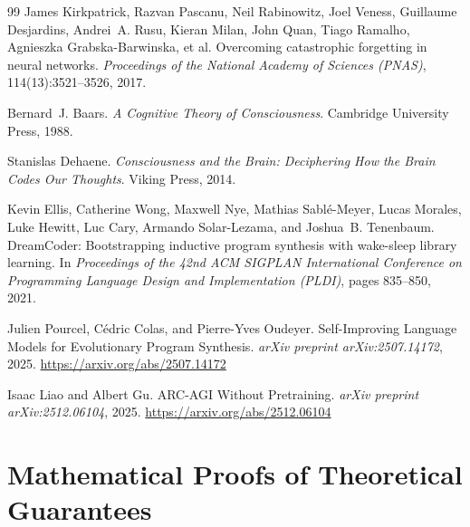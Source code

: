 \documentclass[10pt,a4paper]{article}
\begin{document}
\begin{thebibliography}{99}
James Kirkpatrick, Razvan Pascanu, Neil Rabinowitz, Joel Veness, Guillaume Desjardins, Andrei~A. Rusu, Kieran Milan, John Quan, Tiago Ramalho, Agnieszka Grabska-Barwinska, et al.
\newblock Overcoming catastrophic forgetting in neural networks.
\newblock \emph{Proceedings of the National Academy of Sciences (PNAS)}, 114(13):3521--3526, 2017.

Bernard~J. Baars.
\newblock \emph{A Cognitive Theory of Consciousness}.
\newblock Cambridge University Press, 1988.

Stanislas Dehaene.
\newblock \emph{Consciousness and the Brain: Deciphering How the Brain Codes Our Thoughts}.
\newblock Viking Press, 2014.

Kevin Ellis, Catherine Wong, Maxwell Nye, Mathias Sablé-Meyer, Lucas Morales, Luke Hewitt, Luc Cary, Armando Solar-Lezama, and Joshua~B. Tenenbaum.
\newblock DreamCoder: Bootstrapping inductive program synthesis with wake-sleep library learning.
\newblock In \emph{Proceedings of the 42nd ACM SIGPLAN International Conference on Programming Language Design and Implementation (PLDI)}, pages 835--850, 2021.

Julien Pourcel, Cédric Colas, and Pierre-Yves Oudeyer.
\newblock Self-Improving Language Models for Evolutionary Program Synthesis.
\newblock \emph{arXiv preprint arXiv:2507.14172}, 2025. \url{https://arxiv.org/abs/2507.14172}

Isaac Liao and Albert Gu.
\newblock ARC-AGI Without Pretraining.
\newblock \emph{arXiv preprint arXiv:2512.06104}, 2025. \url{https://arxiv.org/abs/2512.06104}

\end{thebibliography}

\newpage
\appendix

\section{Mathematical Proofs of Theoretical Guarantees}
\label{app:proofs}
\end{document}
